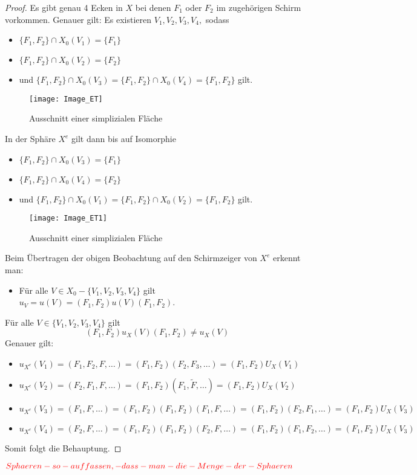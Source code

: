 \documentclass[12pt,titlepage,twoside,cleardoublepage]{article}
\theoremstyle{nummermitklammern}
\numberwithin{equation}{section}
\begin{document}
\begin{proof}
Es gibt genau 4 Ecken in $X$ bei denen $F_1$ oder $F_2$ im zugehörigen Schirm vorkommen. Genauer gilt: Es existieren $V_1,V_2,V_3,V_4,$ sodass 
\begin{itemize}
\item $\{F_1,F_2\} \cap X_0(V_1)=\{F_1\}$ 
\item $\{F_1,F_2\} \cap X_0(V_2)=\{F_2\}$
\item und $\{F_1,F_2\} \cap X_0(V_3)=\{F_1,F_2\} \cap X_0(V_4)=\{F_1,F_2\}$ gilt.
\end{itemize}
\begin{figure}[H]
\begin{center}
\texttt{[image: Image\_ET]}
\end{center}
\caption{Ausschnitt einer simplizialen Fläche}
\end{figure}
In der Sphäre $X^e$ gilt dann bis auf Isomorphie  
\begin{itemize}
\item $\{F_1,F_2\} \cap X_0(V_3)=\{F_1\}$ 
\item $\{F_1,F_2\} \cap X_0(V_4)=\{F_2\}$
\item und $\{F_1,F_2\} \cap X_0(V_1)=\{F_1,F_2\} \cap X_0(V_2)=\{F_1,F_2\}$ gilt.
\end{itemize}
\begin{figure}[H]
\begin{center}
\texttt{[image: Image\_ET1]}
\end{center}
\caption{Ausschnitt einer simplizialen Fläche}
\end{figure}
Beim Übertragen der obigen Beobachtung auf den Schirmzeiger von $X^e$ erkennt man:
\begin{itemize}
\item Für alle $V\in X_0-\{V_1,V_2,V_3,V_4\}$ gilt $u_V=u(V)=(F_1,F_2)u(V) (F_1,F_2)$.
\end{itemize}
Für alle $V\in \{V_1,V_2,V_3,V_4\}$ gilt 
\[
(F_1,F_2)u_X(V)(F_1,F_2) \neq u_X(V)
\]
Genauer gilt:
\begin{itemize} 
\item $u_{X^e}(V_1)=(F_1,F_2,F,\ldots)=(F_1,F_2)(F_2,F_3,\ldots)=(F_1,F_2)U_X(V_1)$
\item $u_{X^e}(V_2)=(F_2,F_1,F,\ldots)=(F_1,F_2)(F_1,\tilde{F},\ldots)=(F_1,F_2)U_X(V_2)$
\item $u_{X^e}(V_3)=(F_1,F,\ldots)=(F_1,F_2)(F_1,F_2)(F_1,F,\ldots)=(F_1,F_2)(F_2,F_1,\ldots)=(F_1,F_2)U_X(V_3)$
\item $u_{X^e}(V_4)=(F_2,F,\ldots)=(F_1,F_2)(F_1,F_2)(F_2,F,\ldots)=(F_1,F_2)(F_1,F_2,\ldots)=(F_1,F_2)U_X(V_3)$

\end{itemize}
Somit folgt die Behauptung.
\end{proof}
$\textcolor{red}{Sphaeren-so-auffassen,-dass-man-die-Menge-der-Sphaeren}$
\end{document}
